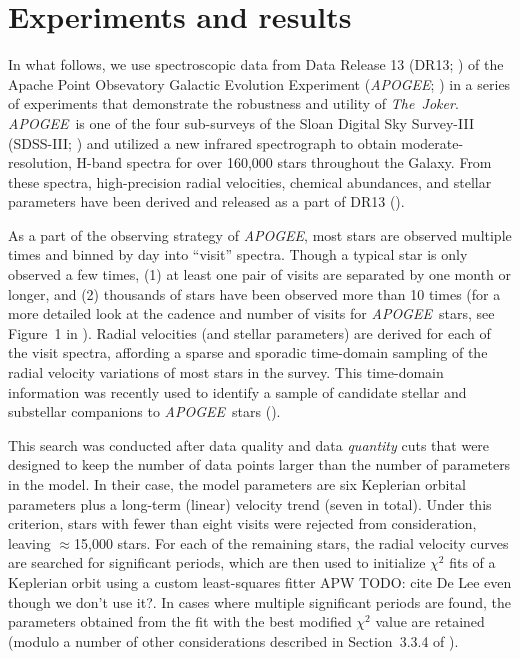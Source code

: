 \documentclass[manuscript, letterpaper]{aastex6}
\newcommand{\project}[1]{\textsl{#1}}
\newcommand{\acronym}[1]{{\small{#1}}}
\newcommand{\apogee}{\project{\acronym{APOGEE}}}
\newcommand{\samplername}{\project{The~Joker}}
\newcommand{\todoapw}[1]{{\color{red}APW TODO: #1}}
\begin{document}
\section{Experiments and results}

In what follows, we use spectroscopic data from Data Release 13 (DR13;
\citealt{SDSS-Collaboration:2016}) of the Apache Point Obsevatory Galactic
Evolution Experiment (\apogee; \citealt{Majewski:2015}) in a series of
experiments that demonstrate the robustness and utility of \samplername.
\apogee\ is one of the four sub-surveys of the Sloan Digital Sky Survey-III
(SDSS-III; \citealt{Eisenstein:2011}) and utilized a new infrared spectrograph
to obtain moderate-resolution, H-band spectra for over 160,000 stars throughout
the Galaxy.
From these spectra, high-precision radial velocities, chemical abundances, and
stellar parameters have been derived and released as a part of DR13
(\citealt{Holtzman:2015,Nidever:2015}).

As a part of the observing strategy of \apogee, most stars are observed
multiple times and binned by day into ``visit'' spectra.
Though a typical star is only observed a few times, (1) at least one pair of
visits are separated by one month or longer, and (2) thousands of stars have
been observed more than 10 times (for a more detailed look at the cadence and
number of visits for \apogee\ stars, see Figure~1 in \citealt{Troup:2016}).
Radial velocities (and stellar parameters) are derived for each of the visit
spectra, affording a sparse and sporadic time-domain sampling of the radial
velocity variations of most stars in the survey.
This time-domain information was recently used to identify a sample of
candidate stellar and substellar companions to \apogee\ stars
(\citealt{Troup:2016}).

This search was conducted after data quality and data \emph{quantity} cuts that
were designed to keep the number of data points larger than the number of
parameters in the model.
In their case, the model parameters are six Keplerian orbital parameters plus a
long-term (linear) velocity trend (seven in total).
Under this criterion, stars with fewer than eight visits were rejected from
consideration, leaving $\approx$15,000 stars.
For each of the remaining stars, the radial velocity curves are searched for
significant periods, which are then used to initialize $\chi^2$ fits of a
Keplerian orbit using a custom least-squares fitter \todoapw{cite De Lee even
though we don't use it?}.
In cases where multiple significant periods are found, the parameters obtained
from the fit with the best modified $\chi^2$ value are retained (modulo a
number of other considerations described in Section~3.3.4 of
\citealt{Troup:2016}).
\end{document}

